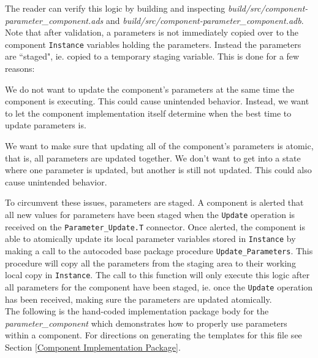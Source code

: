 The reader can verify this logic by building and inspecting \textit{build/src/component-parameter\_component.ads} and \textit{build/src/component-parameter\_component.adb}. \\

Note that after validation, a parameters is not immediately copied over to the component \texttt{Instance} variables holding the parameters. Instead the parameters are ``staged", ie. copied to a temporary staging variable. This is done for a few reasons:

\vspace{5mm} %
\begin{spacedenumerate}
  \item We do not want to update the component's parameters at the same time the component is executing. This could cause unintended behavior. Instead, we want to let the component implementation itself determine when the best time to update parameters is.
  \item We want to make sure that updating all of the component's parameters is atomic, that is, all parameters are updated together. We don't want to get into a state where one parameter is updated, but another is still not updated. This could also cause unintended behavior.
\end{spacedenumerate}
\vspace{5mm} %

To circumvent these issues, parameters are staged. A component is alerted that all new values for parameters have been staged when the \texttt{Update} operation is received on the \texttt{Parameter\_Update.T} connector. Once alerted, the component is able to atomically update its local parameter variables stored in \texttt{Instance} by making a call to the autocoded base package procedure \texttt{Update\_Parameters}. This procedure will copy all the parameters from the staging area to their working local copy in \texttt{Instance}. The call to this function will only execute this logic after all parameters for the component have been staged, ie. once the \texttt{Update} operation has been received, making sure the parameters are updated atomically. \\

The following is the hand-coded implementation package body for the \textit{parameter\_component} which demonstrates how to properly use parameters within a component. For directions on generating the templates for this file see Section \ref{Component Implementation Package}. \\

